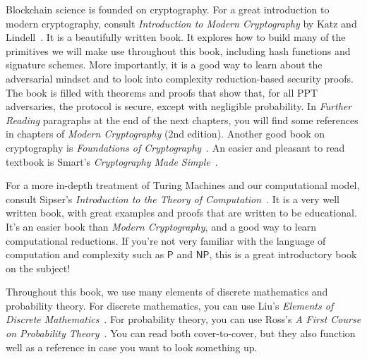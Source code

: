 Blockchain science is founded on cryptography. For a great introduction to modern cryptography,
consult \emph{Introduction to Modern Cryptography} by Katz and Lindell~\cite{katz}. It is a beautifully
written book. It explores how to build many of the primitives we will make use throughout this book,
including hash functions and signature schemes. More importantly, it is a good way to learn about the
adversarial mindset and to look into complexity reduction-based security proofs. The book is filled with
theorems and proofs that show that, for all PPT adversaries, the protocol is secure, except with negligible
probability. In \emph{Further Reading} paragraphs at the end of the next chapters, you will find
some references in chapters of \emph{Modern Cryptography} (2nd edition).
Another good book on cryptography is \emph{Foundations of Cryptography}~\cite{foundations1,foundations2}.
An easier and pleasant to read textbook is Smart's \emph{Cryptography Made Simple}~\cite{smart}.

For a more in-depth treatment of Turing Machines and our computational model, consult Sipser's
\emph{Introduction to the Theory of Computation}~\cite{sipser}. It is a very well written book,
with great examples and proofs that are written to be educational. It's an easier book than
\emph{Modern Cryptography}, and a good way to learn computational reductions. If you're not very
familiar with the language of computation and complexity such as $\textsf{P}$ and $\textsf{NP}$,
this is a great introductory book on the subject!

Throughout this book, we use many elements of discrete mathematics and probability theory. For
discrete mathematics, you can use Liu's \emph{Elements of Discrete Mathematics}~\cite{liu}.
For probability theory, you can use Ross's
\emph{A First Course on Probability Theory}~\cite{ross}. You can read both cover-to-cover, but
they also function well as a reference in case you want to look something up.
